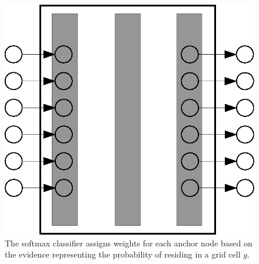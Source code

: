     \begin{figure}[thpb]
       \centering
       \includegraphics[width=\linewidth]{figures/softmax.eps}
       \caption{\label{fig:softmax}The softmax classifier assigns weights for each anchor node based on the evidence representing the probability of residing in a grid cell $g$.}
    \end{figure}

